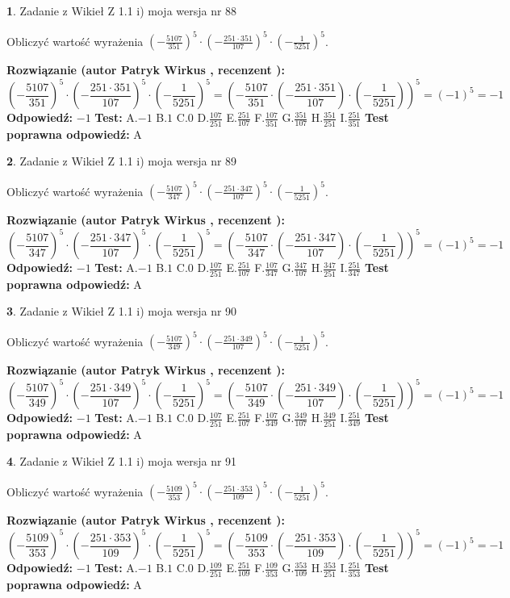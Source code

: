 \documentclass[12pt, a4paper]{article}
\theoremstyle{definition} %
\newtheorem{zad}{}
\newcommand{\zadStart}[1]{\begin{zad}#1\newline}
\newcommand{\zadStop}{\end{zad}}
\newcommand{\rozwStart}[2]{\noindent \textbf{Rozwiązanie (autor #1 , recenzent #2): }\newline}
\newcommand{\rozwStop}{\newline}
\newcommand{\odpStart}{\noindent \textbf{Odpowiedź:}\newline}
\newcommand{\odpStop}{\newline}
\newcommand{\testStart}{\noindent \textbf{Test:}\newline}
\newcommand{\testStop}{\newline}
\newcommand{\kluczStart}{\noindent \textbf{Test poprawna odpowiedź:}\newline}
\newcommand{\kluczStop}{\newline}
\begin{document}
\zadStart{Zadanie z Wikieł Z 1.1 i) moja wersja nr 88}

Obliczyć wartość wyrażenia $(-\frac{5107}{351})^{5} \cdot (-\frac{251 \cdot 351}{107})^{5} \cdot (-\frac{1}{5251})^{5}$.
\zadStop
\rozwStart{Patryk Wirkus}{}
$$(-\frac{5107}{351})^{5} \cdot (-\frac{251 \cdot 351}{107})^{5} \cdot (-\frac{1}{5251})^{5} = (-\frac{5107}{351} \cdot (-\frac{251 \cdot 351}{107}) \cdot (-\frac{1}{5251}))^{5} = (-1)^{5} = -1$$
\rozwStop
\odpStart
$-1$
\odpStop
\testStart
A.$-1$ B.$1$ C.$0$ D.$\frac{107}{251}$ E.$\frac{251}{107}$
F.$\frac{107}{351}$ G.$\frac{351}{107}$
H.$\frac{351}{251}$
I.$\frac{251}{351}$
\testStop
\kluczStart
A
\kluczStop



\zadStart{Zadanie z Wikieł Z 1.1 i) moja wersja nr 89}

Obliczyć wartość wyrażenia $(-\frac{5107}{347})^{5} \cdot (-\frac{251 \cdot 347}{107})^{5} \cdot (-\frac{1}{5251})^{5}$.
\zadStop
\rozwStart{Patryk Wirkus}{}
$$(-\frac{5107}{347})^{5} \cdot (-\frac{251 \cdot 347}{107})^{5} \cdot (-\frac{1}{5251})^{5} = (-\frac{5107}{347} \cdot (-\frac{251 \cdot 347}{107}) \cdot (-\frac{1}{5251}))^{5} = (-1)^{5} = -1$$
\rozwStop
\odpStart
$-1$
\odpStop
\testStart
A.$-1$ B.$1$ C.$0$ D.$\frac{107}{251}$ E.$\frac{251}{107}$
F.$\frac{107}{347}$ G.$\frac{347}{107}$
H.$\frac{347}{251}$
I.$\frac{251}{347}$
\testStop
\kluczStart
A
\kluczStop



\zadStart{Zadanie z Wikieł Z 1.1 i) moja wersja nr 90}

Obliczyć wartość wyrażenia $(-\frac{5107}{349})^{5} \cdot (-\frac{251 \cdot 349}{107})^{5} \cdot (-\frac{1}{5251})^{5}$.
\zadStop
\rozwStart{Patryk Wirkus}{}
$$(-\frac{5107}{349})^{5} \cdot (-\frac{251 \cdot 349}{107})^{5} \cdot (-\frac{1}{5251})^{5} = (-\frac{5107}{349} \cdot (-\frac{251 \cdot 349}{107}) \cdot (-\frac{1}{5251}))^{5} = (-1)^{5} = -1$$
\rozwStop
\odpStart
$-1$
\odpStop
\testStart
A.$-1$ B.$1$ C.$0$ D.$\frac{107}{251}$ E.$\frac{251}{107}$
F.$\frac{107}{349}$ G.$\frac{349}{107}$
H.$\frac{349}{251}$
I.$\frac{251}{349}$
\testStop
\kluczStart
A
\kluczStop



\zadStart{Zadanie z Wikieł Z 1.1 i) moja wersja nr 91}

Obliczyć wartość wyrażenia $(-\frac{5109}{353})^{5} \cdot (-\frac{251 \cdot 353}{109})^{5} \cdot (-\frac{1}{5251})^{5}$.
\zadStop
\rozwStart{Patryk Wirkus}{}
$$(-\frac{5109}{353})^{5} \cdot (-\frac{251 \cdot 353}{109})^{5} \cdot (-\frac{1}{5251})^{5} = (-\frac{5109}{353} \cdot (-\frac{251 \cdot 353}{109}) \cdot (-\frac{1}{5251}))^{5} = (-1)^{5} = -1$$
\rozwStop
\odpStart
$-1$
\odpStop
\testStart
A.$-1$ B.$1$ C.$0$ D.$\frac{109}{251}$ E.$\frac{251}{109}$
F.$\frac{109}{353}$ G.$\frac{353}{109}$
H.$\frac{353}{251}$
I.$\frac{251}{353}$
\testStop
\kluczStart
A
\kluczStop
\end{document}
